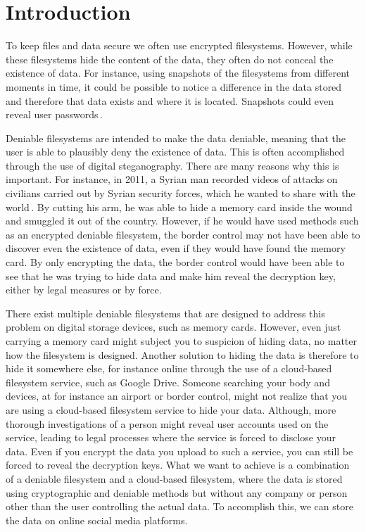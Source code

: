 
\chapter{Introduction}
\label{ch:introduction}

To keep files and data secure we often use encrypted filesystems. However, while these filesystems hide the content of the data, they often do not conceal the existence of data. For instance, using snapshots of the filesystems from different moments in time, it could be possible to notice a difference in the data stored and therefore that data exists and where it is located. Snapshots could even reveal user passwords\,\cite{hanMultiuserSteganographicFile2010}.

Deniable filesystems are intended to make the data deniable, meaning that the user is able to plausibly deny the existence of data. This is often accomplished through the use of digital steganography. There are many reasons why this is important. For instance, in 2011, a Syrian man recorded videos of attacks on civilians carried out by Syrian security forces, which he wanted to share with the world\,\cite{westheadHowSyrianRefugee2012}. By cutting his arm, he was able to hide a memory card inside the wound and smuggled it out of the country. However, if he would have used methods such as an encrypted deniable filesystem, the border control may not have been able to discover even the existence of data, even if they would have found the memory card. By only encrypting the data, the border control would have been able to see that he was trying to hide data and make him reveal the decryption key, either by legal measures or by force.

There exist multiple deniable filesystems that are designed to address this problem on digital storage devices, such as memory cards. However, even just carrying a memory card might subject you to suspicion of hiding data, no matter how the filesystem is designed. Another solution to hiding the data is therefore to hide it somewhere else, for instance online through the use of a \mbox{cloud-based} filesystem service, such as Google Drive. Someone searching your body and devices, at for instance an airport or border control, might not realize that you are using a \mbox{cloud-based} filesystem service to hide your data. Although, more thorough investigations of a person might reveal user accounts used on the service, leading to legal processes where the service is forced to disclose your data. Even if you encrypt the data you upload to such a service, you can still be forced to reveal the decryption keys. What we want to achieve is a combination of a deniable filesystem and a \mbox{cloud-based} filesystem, where the data is stored using cryptographic and deniable methods but without any company or person other than the user controlling the actual data. To accomplish this, we can store the data on online social media platforms.

